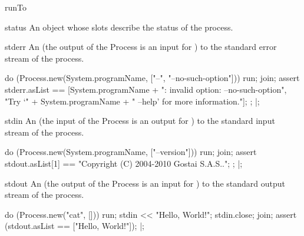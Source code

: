 \begin{urbiscriptapi}
\item[runTo]

\item[status] An object whose slots describe the status of the
  process.

\item[stderr] An  (the output of the Process is
  an input for \urbi) to the standard error stream of the process.
\begin{urbiscript}
do (Process.new(System.programName, ["--", "--no-such-option"]))
{
  run;
  join;
  assert
  {
    stderr.asList ==
    [System.programName + ": invalid option: --no-such-option",
     "Try `" + System.programName + " --help' for more information."];
  };
}|;
\end{urbiscript}

\item[stdin] An  (the input of the Process is
  an output for \urbi) to the standard input stream of the process.
\begin{urbiscript}
do (Process.new(System.programName, ["--version"]))
{
  run;
  join;
  assert
  {
    stdout.asList[1] == "Copyright (C) 2004-2010 Gostai S.A.S..";
  };
}|;
\end{urbiscript}

\item[stdout] An  (the output of the Process is
  an input for \urbi) to the standard output stream of the process.
\begin{urbiscript}
do (Process.new("cat", []))
{
  run;
  stdin << "Hello, World!\n";
  stdin.close;
  join;
  assert (stdout.asList == ["Hello, World!"]);
}|;
\end{urbiscript}
\end{urbiscriptapi}


